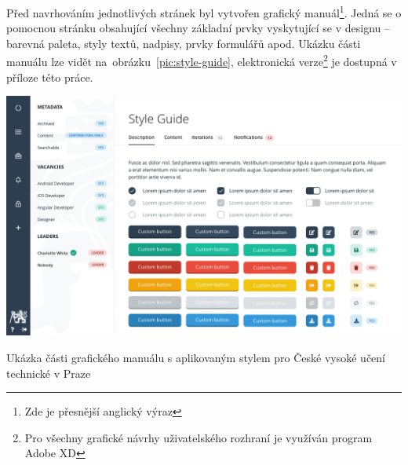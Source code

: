 Před navrhováním jednotlivých stránek byl vytvořen grafický manuál\footnote{Zde je přesnější anglický výraz }. Jedná se o pomocnou stránku obsahující všechny základní prvky vyskytující se v designu -- barevná paleta, styly textů, nadpisy, prvky formulářů apod. Ukázku části manuálu lze vidět na~obrázku~\ref{pic:style-guide}, elektronická verze\footnote{Pro všechny grafické návrhy uživatelského rozhraní je využíván program Adobe XD} je dostupná v příloze této práce.

\begin{fig:illustration}
   \includegraphics[width=1\textwidth]{images/style-guide.png}
   \caption{Ukázka části grafického manuálu s aplikovaným stylem pro České vysoké učení technické v Praze}\label{pic:style-guide}
\end{fig:illustration}